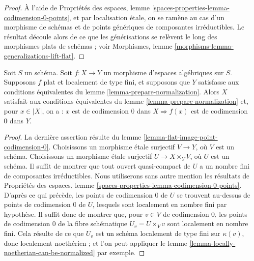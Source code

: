 \begin{proof}
À l'aide de Propriétés des espaces, lemme
\ref{spaces-properties-lemma-codimension-0-points}, et par localisation étale,
on se ramène au cas d'un morphisme de schémas et de points génériques
de composantes irréductibles. Le résultat découle alors de ce que les générisations
se relèvent le long des morphismes plats de schémas ; voir
Morphismes, lemme \ref{morphisms-lemma-generalizations-lift-flat}.
\end{proof}

\begin{lemma}
\label{lemma-flat-locally-finite-type-points-codimension-0}
Soit $S$ un schéma. Soit $f : X \to Y$ un morphisme d'espaces
algébriques sur $S$. Supposons $f$ plat et localement de type fini, et
supposons que $Y$ satisfasse aux conditions équivalentes du
lemme \ref{lemma-prepare-normalization}.
Alors $X$ satisfait aux conditions équivalentes du
lemme \ref{lemma-prepare-normalization} et, pour $x \in |X|$, on a :
$x$ est de codimension $0$ dans $X \Rightarrow f(x)$ est de codimension $0$ dans $Y$.
\end{lemma}

\begin{proof}
La dernière assertion résulte du
lemme \ref{lemma-flat-image-point-codimension-0}.
Choisissons un morphisme étale surjectif $V \to Y$, où $V$ est un schéma.
Choisissons un morphisme étale surjectif $U \to X \times_Y V$, où $U$
est un schéma. Il suffit de montrer que tout ouvert quasi-compact
de $U$ a un nombre fini de composantes irréductibles.
Nous utiliserons sans autre mention les résultats de
Propriétés des espaces, lemme \ref{spaces-properties-lemma-codimension-0-points}.
D'après ce qui précède,
les points de codimension $0$ de $U$ se trouvent au-dessus de
points de codimension $0$ de $U$, lesquels sont localement en nombre fini par
hypothèse. Il suffit donc de montrer que, pour $v \in V$ de codimension $0$,
les points de codimension $0$ de la fibre schématique $U_v = U \times_V v$
sont localement en nombre fini. Cela résulte de ce que $U_v$ est un schéma
localement de type fini sur $\kappa(v)$, donc localement noethérien ;
et l'on peut appliquer le lemme \ref{lemma-locally-noetherian-can-be-normalized}
par exemple.
\end{proof}

